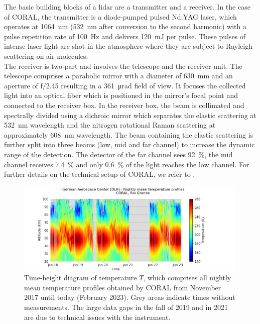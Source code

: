 The basic building blocks of a lidar are a transmitter and a receiver. In the case of CORAL, the transmitter is a diode-pumped pulsed Nd:YAG laser, which operates at \SI{1064}{nm} (\SI{532}{nm} after conversion to the second harmonic) with a pulse repetition rate of \SI{100}{Hz} and delivers \SI{120}{mJ} per pulse. These pulses of intense laser light are shot in the atmosphere where they are subject to Rayleigh scattering on air molecules.\\
The receiver is two-part and involves the telescope and the receiver unit. The telescope comprises a parabolic mirror with a diameter of \SI{630}{mm} and an aperture of f/2.45 resulting in a \SI{361}{\micro rad} field of view. It focuses the collected light into an optical fiber which is positioned in the mirror's focal point and connected to the receiver box. In the receiver box, the beam is collimated and spectrally divided using a dichroic mirror which separates the elastic scattering at \SI{532}{nm} wavelength and the nitrogen rotational Raman scattering at approximately \SI{608}{nm} wavelength. The beam containing the elastic scattering is further split into three beams (low, mid and far channel) to increase the dynamic range of the detection. The detector of the far channel sees \SI{92}{\percent}, the mid channel receives \SI{7.4}{\percent} and only \SI{0.6}{\percent} of the light reaches the low channel. For further details on the technical setup of CORAL, we refer to \textcite{kaifler_compact_2021}.
%
\begin{figure}[t]
    \centering
    \includegraphics[width=0.99\textwidth]{figures_methods/coral_nightly_means.png}
    \caption{Time-height diagram of temperature $T$, which comprises all nightly mean temperature profiles obtained by CORAL from November 2017 until today (February 2023). Grey areas indicate times without measurements. The large data gaps in the fall of 2019 and in 2021 are due to technical issues with the instrument.}
    \label{fig:coral_dataset}
\end{figure}

